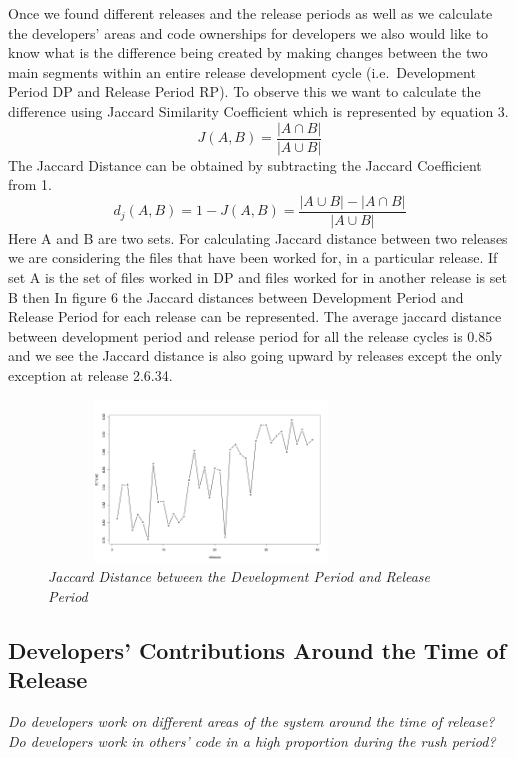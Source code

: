 \documentclass{acm_proc_article-sp}
\begin{document}
Once we found different releases and the release periods as well as we calculate the developers' areas and code ownerships for developers we also would like to know what is the difference being created by making changes between the two main segments within an entire release development cycle (i.e.\ Development Period DP and Release Period RP). To observe this we want to calculate the difference using Jaccard Similarity Coefficient \cite{jaccard_alpine} which is represented by equation 3.
\begin{equation} J(A, B) =\frac{|A \cap B|}{|A \cup B|} \end{equation}
The Jaccard Distance can be obtained by subtracting the Jaccard Coefficient from 1.
\begin{equation} d_j(A, B) = 1 - J(A, B) = \frac{|A \cup B|-|A \cap B|}{|A \cup B|} \end{equation}
Here A and B are two sets. For calculating Jaccard distance between two releases we are considering the files that have been worked for, in a particular release. If set A is the set of files worked in DP and files worked for in another release is set B then In figure 6 the Jaccard distances between Development Period and Release Period for each release can be represented. The average jaccard distance between development period and release period for all the release cycles is 0.85 and we see the Jaccard distance is also going upward by releases except the only exception at release 2.6.34.

\begin{figure}
\begin{center}
\includegraphics[height=1.7in,width=3.4in]{jdMPRP.png}
\caption{\small \sl Jaccard Distance between the Development Period and Release Period}
\end{center}
\end{figure}

\subsection{Developers' Contributions Around the Time of Release}
\textit{Do developers work on different areas of the system around the time of release?}\newline
\textit{Do developers work in others' code in a high proportion during the rush period?}
\end{document}

